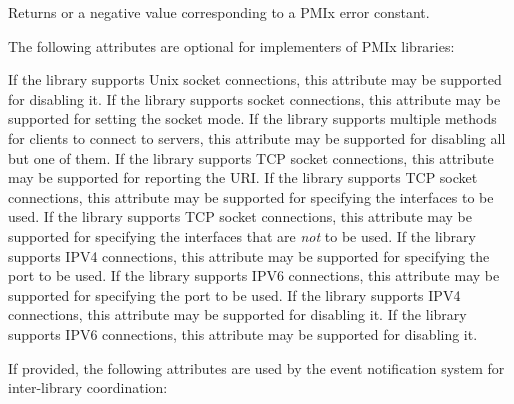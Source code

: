 Returns  or a negative value corresponding to a \ac{PMIx} error constant.

\optattrstart
The following attributes are optional for implementers of \ac{PMIx} libraries:

 If the library supports Unix socket connections, this attribute may be supported for disabling it.
\pasteAttributeItemEnd{}
 If the library supports socket connections, this attribute may be supported for setting the socket mode.
\pasteAttributeItemEnd{}
 If the library supports multiple methods for clients to connect to servers, this attribute may be supported for disabling all but one of them.
\pasteAttributeItemEnd{}
 If the library supports TCP socket connections, this attribute may be supported for reporting the URI.
\pasteAttributeItemEnd{}
 If the library supports TCP socket connections, this attribute may be supported for specifying the interfaces to be used.
\pasteAttributeItemEnd{}
 If the library supports TCP socket connections, this attribute may be supported for specifying the interfaces that are \textit{not} to be used.
\pasteAttributeItemEnd{}
 If the library supports IPV4 connections, this attribute may be supported for specifying the port to be used.
\pasteAttributeItemEnd{}
 If the library supports IPV6 connections, this attribute may be supported for specifying the port to be used.
\pasteAttributeItemEnd{}
 If the library supports IPV4 connections, this attribute may be supported for disabling it.
\pasteAttributeItemEnd{}
 If the library supports IPV6 connections, this attribute may be supported for disabling it.
\pasteAttributeItemEnd{}

\vspace{\baselineskip}
If provided, the following attributes are used by the event notification system for inter-library coordination:


